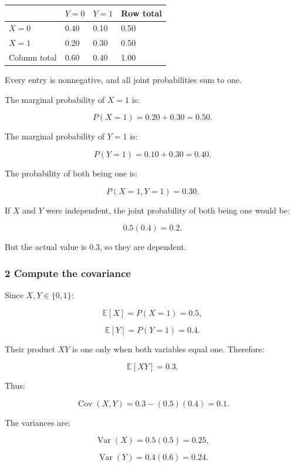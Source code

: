 {\def\LTcaptype{none} %
\begin{longtable}[]{@{}llll@{}}
\toprule\noalign{}
& \(Y=0\) & \(Y=1\) & Row total \\
\midrule\noalign{}
\endhead
\bottomrule\noalign{}
\endlastfoot
\(X=0\) & 0.40 & 0.10 & 0.50 \\
\(X=1\) & 0.20 & 0.30 & 0.50 \\
Column total & 0.60 & 0.40 & 1.00 \\
\end{longtable}
}

Every entry is nonnegative, and all joint probabilities sum to one.

The marginal probability of \(X=1\) is:

\[
 P(X=1)=0.20+0.30=0.50.
\]

The marginal probability of \(Y=1\) is:

\[
 P(Y=1)=0.10+0.30=0.40.
\]

The probability of both being one is:

\[
 P(X=1,Y=1)=0.30.
\]

If \(X\) and \(Y\) were independent, the joint probability of both being one would be:

\[
 0.5(0.4)=0.2.
\]

But the actual value is \(0.3\), so they are dependent.

\subsubsection{2 Compute the covariance}\label{02-foundations-ii-ch023-compute-the-covariance}

\hypertarget{02-foundations-ii-ch023-compute-the-covariance}{}

Since \(X,Y\in\{0,1\}\):

\[
 \mathbb E[X]=P(X=1)=0.5,
\]

\[
 \mathbb E[Y]=P(Y=1)=0.4.
\]

Their product \(XY\) is one only when both variables equal one. Therefore:

\[
 \mathbb E[XY]=0.3.
\]

Thus:

\[
 \operatorname{Cov}(X,Y) = 0.3-(0.5)(0.4) =\boxed{0.1}.
\]

The variances are:

\[
 \operatorname{Var}(X)=0.5(0.5)=0.25,
\]

\[
 \operatorname{Var}(Y)=0.4(0.6)=0.24.
\]

